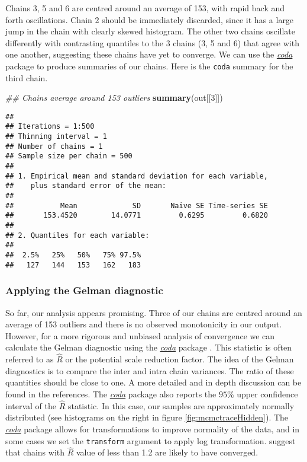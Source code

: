\documentclass[9pt,a4paper,]{extarticle}
\newenvironment{Shaded}{\begin{snugshade}}{\end{snugshade}}
\newcommand{\CommentTok}[1]{\textcolor[rgb]{0.56,0.35,0.01}{\textit{#1}}}
\newcommand{\DecValTok}[1]{\textcolor[rgb]{0.00,0.00,0.81}{#1}}
\newcommand{\KeywordTok}[1]{\textcolor[rgb]{0.13,0.29,0.53}{\textbf{#1}}}
\newcommand{\NormalTok}[1]{#1}
\begin{document}
Chains 3, 5 and 6 are centred around an average of 153, with rapid
back and forth oscillations. Chain 2 should be immediately discarded,
since it has a large jump in the chain with clearly skewed
histogram. The other two chains oscillate differently with contrasting
quantiles to the 3 chains (3, 5 and 6) that agree with one another,
suggesting these chains have yet to converge. We can use the
\emph{\href{https://CRAN.R-project.org/package=coda}{coda}} package to produce
summaries of our chains. Here is the \texttt{coda} summary for the third
chain.

\begin{Shaded}
\begin{Highlighting}[]
\CommentTok{## Chains average around 153 outliers}
\KeywordTok{summary}\NormalTok{(out[[}\DecValTok{3}\NormalTok{]])}
\end{Highlighting}
\end{Shaded}

\begin{verbatim}
## 
## Iterations = 1:500
## Thinning interval = 1 
## Number of chains = 1 
## Sample size per chain = 500 
## 
## 1. Empirical mean and standard deviation for each variable,
##    plus standard error of the mean:
## 
##           Mean             SD       Naive SE Time-series SE 
##       153.4520        14.0771         0.6295         0.6820 
## 
## 2. Quantiles for each variable:
## 
##  2.5%   25%   50%   75% 97.5% 
##   127   144   153   162   183
\end{verbatim}

\hypertarget{applying-the-gelman-diagnostic}{%
\subsubsection{Applying the Gelman diagnostic}\label{applying-the-gelman-diagnostic}}

So far, our analysis appears promising. Three of our chains are centred around
an average of 153 outliers and there is no observed monotonicity in
our output. However, for a more rigorous and unbiased analysis of
convergence we can calculate the Gelman diagnostic using the
\emph{\href{https://CRAN.R-project.org/package=coda}{coda}} package
\citep{Gelman:1992, Brooks:1998}. This statistic is often referred to as
\(\hat{R}\) or the potential scale reduction factor. The idea of the
Gelman diagnostics is to compare the inter and intra chain
variances. The ratio of these quantities should be close to one. A more detailed and in depth discussion can be found
in the references. The \emph{\href{https://CRAN.R-project.org/package=coda}{coda}} package also
reports the \(95\%\) upper confidence interval of the \(\hat{R}\)
statistic. In this case, our samples are approximately normally distributed (see
histograms on the right in figure \ref{fig:mcmctraceHidden}). The
\emph{\href{https://CRAN.R-project.org/package=coda}{coda}} package allows for
transformations to improve normality of the data, and in some cases we
set the \texttt{transform} argument to apply log transformation. \citet{Gelman:1992}
suggest that chains with \(\hat{R}\) value of less than 1.2 are likely
to have converged.
\end{document}
